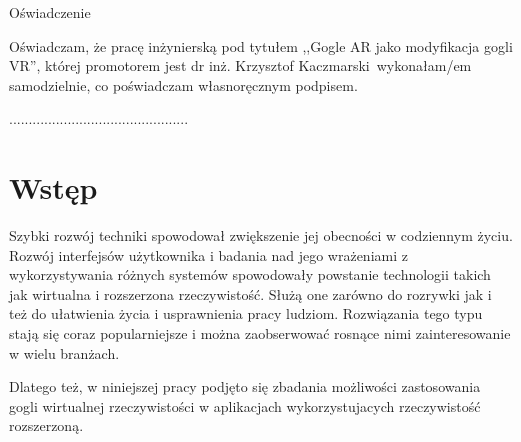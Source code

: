 \documentclass[a4paper,11pt,twoside]{report}
\theoremstyle{definition}
\newcommand{\tytul}{Gogle AR jako modyfikacja gogli VR}
\renewcommand{\title}{AR googles as modified VR googles}
\newcommand{\type}{inżyniers} %
\newcommand{\supervisor}{dr inż. Krzysztof Kaczmarski}
\begin{document}
\begin{center}
Oświadczenie %
\end{center}

\indent Oświadczam, że pracę \type ką pod
tytułem ,,\tytul '', której promotorem jest \supervisor \ wykonałam/em
samodzielnie, co poświadczam własnoręcznym podpisem.
\vspace{2cm}



\begin{flushright}
  \begin{minipage}{50mm}
    \begin{center}
      ..............................................

    \end{center}
  \end{minipage}
\end{flushright}

\thispagestyle{empty}
\newpage

\null\thispagestyle{empty}\newpage

\tableofcontents
\thispagestyle{empty}
\newpage
\null\thispagestyle{empty}\newpage
\setcounter{page}{11}
\pagestyle{fancy}


\chapter*{Wstęp} %

Szybki rozwój techniki spowodował zwiększenie jej obecności w codziennym życiu. Rozwój interfejsów użytkownika i badania nad jego wrażeniami z wykorzystywania różnych systemów spowodowały powstanie technologii takich jak wirtualna i rozszerzona rzeczywistość. Służą one zarówno do rozrywki jak i też do ułatwienia życia i usprawnienia pracy ludziom. Rozwiązania tego typu stają się coraz popularniejsze i można zaobserwować rosnące nimi zainteresowanie w wielu branżach.

Dlatego też, w niniejszej pracy podjęto się zbadania możliwości zastosowania gogli wirtualnej rzeczywistości w aplikacjach wykorzystujacych rzeczywistość rozszerzoną.
\end{document}
